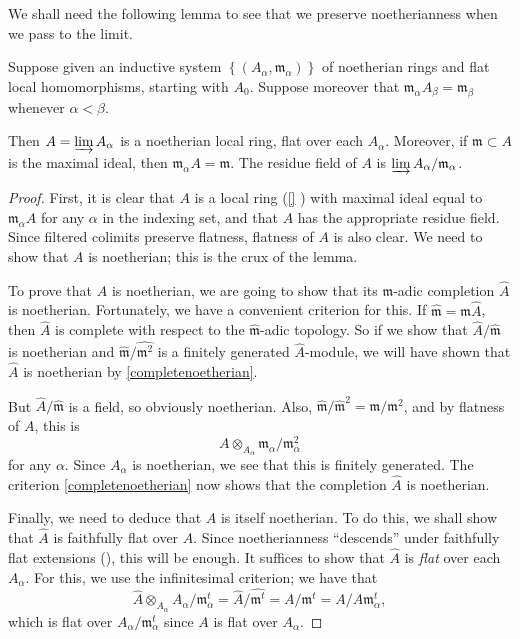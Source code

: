 We shall need the following lemma to see that we preserve noetherianness when
we pass to the limit.
\begin{lemma}\label{indlimnoetherianlocal} 
Suppose given an inductive system $\left\{(A_\alpha,
\mathfrak{m}_{\alpha})\right\}$ of noetherian
rings and flat local homomorphisms, starting with $A_0$.
Suppose moreover that $\mathfrak{m}_{\alpha} A_{\beta} = \mathfrak{m}_{\beta}$
whenever $\alpha < \beta$.

Then $A = \varinjlim A_\alpha$ is a
noetherian local ring, flat over each $A_\alpha$. Moreover, if $\mathfrak{m} \subset A$
is the maximal ideal, then $\mathfrak{m}_\alpha A = \mathfrak{m}$. The residue
field of $A$ is $\varinjlim A_\alpha/\mathfrak{m}_\alpha$.
\end{lemma}
\begin{proof} 
First, it is clear that $A$ is a local ring (\cref{} ) with
maximal ideal equal to $\mathfrak{m}_\alpha A$ for any $\alpha $ in the
indexing set, and that $A$ has the appropriate residue field. Since filtered colimits preserve flatness, flatness of $A$ is
also clear. 
We need to show that $A$ is noetherian; this is the crux of the lemma. 

To prove that $A$ is noetherian, we are going to show that its
$\mathfrak{m}$-adic completion $\hat{A}$ is noetherian. Fortunately, we have a
convenient criterion for this. If $\hat{\mathfrak{m}}=
\mathfrak{m}\hat{A}$, then $\hat{A}$ is complete with respect to the
$\hat{\mathfrak{m}}$-adic topology. So if we show that
$\hat{A}/\hat{\mathfrak{m}}$ is noetherian and
$\hat{\mathfrak{m}}/\hat{\mathfrak{m}^2}$ is a finitely generated
$\hat{A}$-module, we will have shown that $\hat{A}$ is noetherian by
\cref{completenoetherian}.

But $\hat{A}/\hat{\mathfrak{m}}$ is a field, so obviously noetherian. 
Also, $\hat{\mathfrak{m}}/\hat{\mathfrak{m}}^2 = \mathfrak{m}/\mathfrak{m}^2$,
and by flatness of $A$, this is 
\[ A \otimes_{A_\alpha} \mathfrak{m}_\alpha/\mathfrak{m}_\alpha^2  \]
for any $\alpha$. Since $A_\alpha$ is noetherian, we see that this is finitely
generated. The criterion \cref{completenoetherian} now shows that the completion $\hat{A}$ is
noetherian.

Finally, we need to deduce that $A$ is itself noetherian. 
To do this,
we shall show that $\hat{A}$ is faithfully flat over $A$. Since noetherianness
``descends'' under faithfully flat extensions (), this
will be enough. It suffices to show that $\hat{A}$ is \emph{flat} over each
$A_\alpha$. For this, we use the infinitesimal criterion; we have that
\[ \hat{A} \otimes_{A_\alpha} A_\alpha/\mathfrak{m}_\alpha^t =
\hat{A}/\hat{\mathfrak{m}^t} = A/\mathfrak{m}^t = A/A\mathfrak{m}_\alpha^t,  \]
which is flat over $A_\alpha/\mathfrak{m}_\alpha^t$ since $A$ is flat over
$A_\alpha$.


\end{proof}
